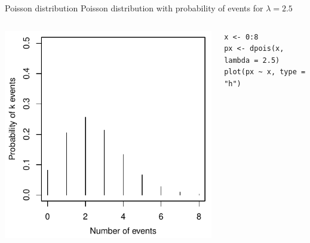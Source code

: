 \documentclass[aspectratio=169]{beamer}
\begin{document}
\begin{frame}[fragile]{Poisson distribution}
  Poisson distribution with probability of events for $\lambda = 2.5$\\[2ex]

\begin{columns}[c]
\begin{column}{.5\textwidth}
  \begin{center}
    \includegraphics[scale=.7]{../figures/pois_dist}
  \end{center}
\end{column}
\begin{column}{.5\textwidth}
  \begin{lstlisting}
x <- 0:8
px <- dpois(x, lambda = 2.5)
plot(px ~ x, type = "h")
\end{lstlisting}
\end{column}
\end{columns}
\end{frame}
\end{document}
